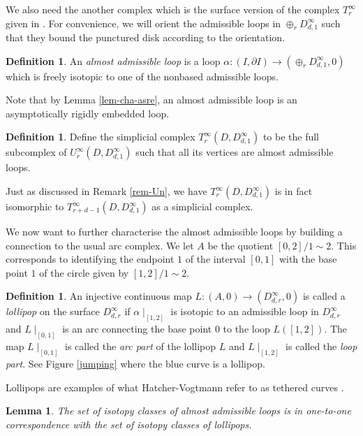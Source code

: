 \documentclass[11pt, a4paper]{amsart}
\newtheorem{lem}[thm]{Lemma}
\theoremstyle{definition}
\newtheorem{defn}[thm]{Definition} %
\begin{document}
We also need the another complex which is the surface version of the complex $T_r^\infty$ given in \cite[Defintion 2.14]{SW19}.  For convenience, we will orient the admissible loops in $\oplus_r D^{\infty}_{d,1}$ such that they bound the punctured disk according to the orientation. 

\begin{defn}
An \emph{almost admissible loop} is a loop $\alpha: (I,\partial I) \to (\oplus_r D^{\infty}_{d,1},0)$ which is freely isotopic to one of the nonbased admissible loops.
\end{defn}


Note that by Lemma \ref{lem-cha-asre}, an almost admissible loop is an asymptotically rigidly embedded loop. 

\begin{defn}\label{defn-subcpxT}
Define the simplicial complex $T_r^{\infty}(D,D^{\infty}_{d,1})$ to be the full subcomplex of $U_r^{\infty}(D,D^{\infty}_{d,1})$ such that all its vertices are almost admissible loops. 
\end{defn}

Just as discussed in Remark \ref{rem-Un}, we have $T_r^{\infty}(D,D^{\infty}_{d,1})$ is in fact isomorphic to $T_{r+d-1}^{\infty}(D,D^{\infty}_{d,1})$ as a simplicial complex.


We now want to further characterise the almost admissible loops by building a connection to the usual arc complex. We let $A$ be the quotient $[0,2]/1\sim 2$. This corresponds to identifying the endpoint $1$ of the interval $[0,1]$ with the base point $1$ of the circle given by $[1,2]/1\sim 2$. 

\begin{defn}
 An injective continuous map  $L: (A,0) \to (D^{\infty}_{d,r},0)$ is called a \emph{lollipop} on the surface $D^{\infty}_{d,r}$ if $\alpha\mid_{[1,2]}$ is isotopic to an admissible loop in $D^{\infty}_{d,r}$ and $L\mid_{[0,1]}$ is an arc connecting the base point $0$ to the loop $L([1,2])$. The map $L\mid_{[0,1]}$ is called the \emph{arc part} of the lollipop $L$ and $L\mid_{[1,2]}$ is called the \emph{loop part}. See Figure \ref{jumping} where the blue curve is a lollipop.
\end{defn}

Lollipops are examples of what Hatcher-Vogtmann refer to as tethered curves \cite{HV17}.

\begin{lem} \label{lem:loop-arc}
The set of isotopy classes of almost admissible loops is in one-to-one correspondence with the set of isotopy classes of lollipops.  
\end{lem}
\end{document}

